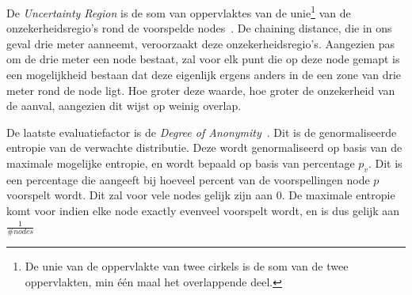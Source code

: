 De \textit{Uncertainty Region} is de som van oppervlaktes van de
unie\footnote{De unie van de oppervlakte van twee cirkels is de som van de twee
    oppervlakten, min één maal het overlappende deel.} van de onzekerheidsregio's
rond de voorspelde nodes~\cite{Dhondt,Verdonck_2022}. De chaining distance, die
in ons geval drie meter aanneemt, veroorzaakt deze onzekerheidsregio's.
Aangezien pas om de drie meter een node bestaat, zal voor elk punt die op deze
node gemapt is een mogelijkheid bestaan dat deze eigenlijk ergens anders in de
een zone van drie meter rond de node ligt. Hoe groter deze waarde, hoe groter
de onzekerheid van de aanval, aangezien dit wijst op weinig overlap.

De laatste evaluatiefactor is de \textit{Degree of
    Anonymity}~\cite{Dhondt,Verdonck_2022}. Dit is de genormaliseerde entropie van
de verwachte distributie. Deze wordt genormaliseerd op basis van de maximale
mogelijke entropie, en wordt bepaald op basis van percentage $p_v$. Dit is een
percentage die aangeeft bij hoeveel percent van de voorspellingen node $p$
voorspelt wordt. Dit zal voor vele nodes gelijk zijn aan 0. De maximale
entropie komt voor indien elke node exactly evenveel voorspelt wordt, en is dus
gelijk aan $\frac{1}{\# nodes}$

